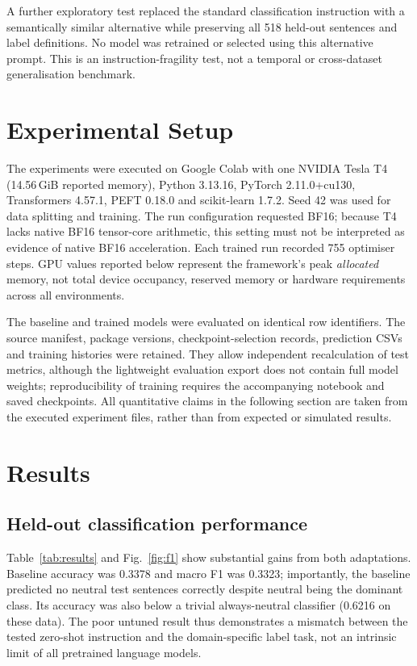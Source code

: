 \documentclass[conference,a4paper]{IEEEtran}
\begin{document}
A further exploratory test replaced the standard classification instruction with a semantically similar alternative while preserving all 518 held-out sentences and label definitions. No model was retrained or selected using this alternative prompt. This is an instruction-fragility test, not a temporal or cross-dataset generalisation benchmark.

\section{Experimental Setup}
The experiments were executed on Google Colab with one NVIDIA Tesla T4 (14.56\,GiB reported memory), Python 3.13.16, PyTorch 2.11.0+cu130, Transformers 4.57.1, PEFT 0.18.0 and scikit-learn 1.7.2. Seed 42 was used for data splitting and training. The run configuration requested BF16; because T4 lacks native BF16 tensor-core arithmetic, this setting must not be interpreted as evidence of native BF16 acceleration. Each trained run recorded 755 optimiser steps. GPU values reported below represent the framework's peak \emph{allocated} memory, not total device occupancy, reserved memory or hardware requirements across all environments.

The baseline and trained models were evaluated on identical row identifiers. The source manifest, package versions, checkpoint-selection records, prediction CSVs and training histories were retained. They allow independent recalculation of test metrics, although the lightweight evaluation export does not contain full model weights; reproducibility of training requires the accompanying notebook and saved checkpoints. All quantitative claims in the following section are taken from the executed experiment files, rather than from expected or simulated results.

\section{Results}
\subsection{Held-out classification performance}
Table~\ref{tab:results} and Fig.~\ref{fig:f1} show substantial gains from both adaptations. Baseline accuracy was 0.3378 and macro F1 was 0.3323; importantly, the baseline predicted no neutral test sentences correctly despite neutral being the dominant class. Its accuracy was also below a trivial always-neutral classifier (0.6216 on these data). The poor untuned result thus demonstrates a mismatch between the tested zero-shot instruction and the domain-specific label task, not an intrinsic limit of all pretrained language models.
\end{document}
